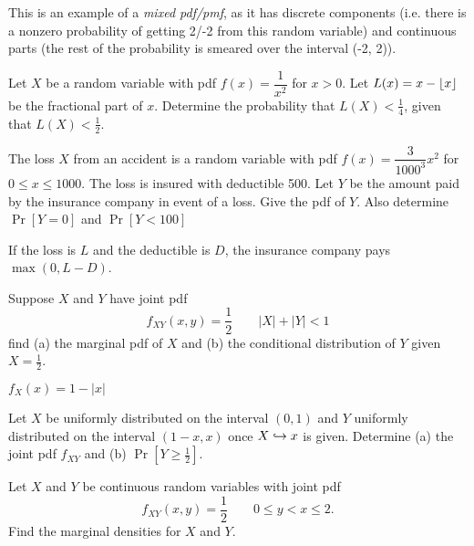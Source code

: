 \documentclass[../main.tex]{subfiles}
\begin{document}

\begin{remark}
    This is an example of a \textit{mixed pdf/pmf}, as it has discrete components (i.e. there is a nonzero probability of getting 2/-2 from this random variable) and continuous parts (the rest of the probability is smeared over the interval (-2, 2)). 
\end{remark}
\begin{example}
	Let $X$ be a random variable with pdf $f(x) = \dfrac{1}{x^2}$ for $x>0$. 
	Let $L(x) = x - \lfloor x\rfloor$ be the fractional part of $x$. Determine the
	probability that $L(X) < \frac14$, given that $L(X) < \frac12$.
\end{example}

\begin{example}
	The loss $X$ from an accident is a random variable with pdf $f(x) = \dfrac{3}{1000^3}x^2$ for $0 \leq x \leq 1000$. The loss is insured with
	deductible 500. Let $Y$ be the amount paid by the insurance company in event
	of a loss. Give the pdf of $Y$. Also determine $\Pr[Y=0]$ and $\Pr[Y<100]$
\end{example}
\begin{remark}
    If the loss is $L$ and the deductible is $D$, the insurance company pays $\max(0, L-D)$. 
\end{remark}
\begin{solution}
\end{solution}
\begin{example}
	Suppose $X$ and $Y$ have joint pdf
	$$f_{XY}(x,y) = \dfrac{1}{2} \qquad |X| + |Y| < 1$$
	find (a) the marginal pdf of $X$ and (b) the conditional distribution of $Y$
	given $X = \frac12$.
\end{example}
\begin{solution}
$f_X(x) = 1 - |x|$
\end{solution}
\begin{example}
	Let $X$ be uniformly distributed on the interval $(0,1)$ and $Y$
	uniformly distributed on the interval $(1-x,x)$ once $X \hookrightarrow x$ is given.
	Determine (a) the joint pdf $f_{XY}$ and (b) $\Pr[Y \geq \frac12]$.
\end{example}

\begin{example}
	Let $X$ and $Y$ be continuous random variables with joint pdf
	$$f_{XY}(x,y) = \dfrac{1}{2} \qquad 0\leq y <x \leq 2.$$
	Find the marginal densities for $X$ and $Y$.
\end{example}
\end{document}
